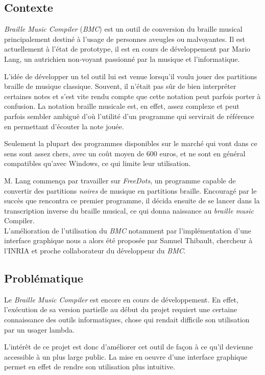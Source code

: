 \subsection*{Contexte}
\textit{Braille Music Compiler} (\textit{BMC}) est un outil de conversion du braille
musical principalement destiné à l'usage de personnes aveugles ou
malvoyantes. Il est actuellement à l'état de prototype, il est en
cours de développement par Mario Lang, un autrichien non-voyant
passionné par la musique et l'informatique.

L'idée de développer un tel outil lui est venue lorsqu'il voulu jouer
des partitions braille de musique classique. Souvent, il n'était pas
sûr de bien interpréter certaines notes et s'est vite rendu compte que
cette notation peut parfois porter à confusion. La notation braille
musicale est, en effet, assez complexe et peut parfois sembler ambiguë
d'où l'utilité d'un programme qui servirait de référence en permettant
d'écouter la note jouée.
  
Seulement la plupart des programmes disponibles sur le marché qui vont
dans ce sens sont assez chers, avec un coût moyen de 600 euros, et ne
sont en général compatibles qu'avec Windows, ce qui limite leur
utilisation.
 
M. Lang commença par travailler sur \textit{FreeDots}, un programme
capable de convertir des partitions \textit{noires} de musique en
partitions braille. Encouragé par le succès que rencontra ce premier
programme, il décida ensuite de se lancer dans la transcription
inverse du braille musical, ce qui donna naissance au \textit{braille music}
Compiler. \\
  
L'amélioration de l'utilisation du \textit{BMC} notamment par l'implémentation
d'une interface graphique nous a alors été proposée par Samuel
Thibault, chercheur à l'INRIA et proche collaborateur du développeur
du \textit{BMC}.
  
  
 
\subsection*{Problématique}
Le \textit{Braille Music Compiler} est encore en cours de développement. En
effet, l'exécution de sa version partielle au début du projet requiert
une certaine connaissance des outils informatiques, chose qui rendait
difficile son utilisation par un usager lambda.

L'intérêt de ce projet est donc d'améliorer cet outil de façon à ce
qu'il devienne accessible à un plus large public. La mise en oeuvre
d'une interface graphique permet en effet de rendre son utilisation
plus intuitive.

